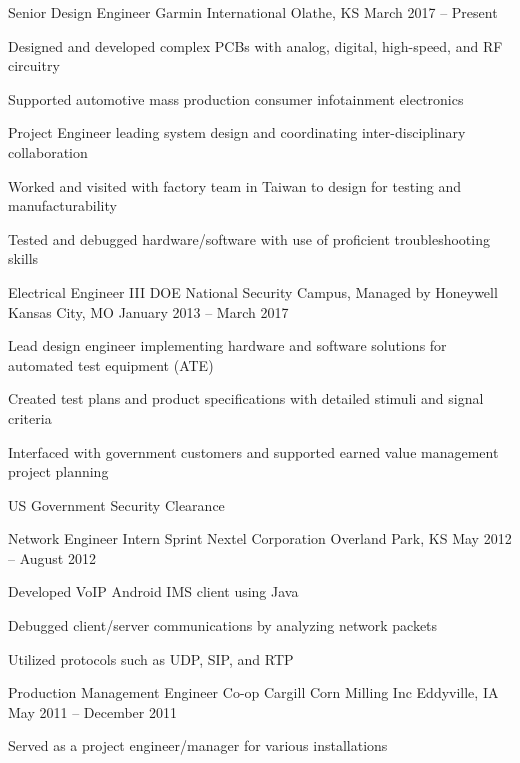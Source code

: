 \documentclass[]{awesome-cv}
\begin{document}
\vspace{-2mm}
\begin{cventries}
	\cventry
	{Senior Design Engineer}
	{Garmin International}
	{Olathe, KS}
	{March 2017 – Present}
	{\begin{cvitems}
		\item {Designed and developed complex PCBs with analog, digital, high-speed, and RF circuitry}
		\item {Supported automotive mass production consumer infotainment electronics}
		\item {Project Engineer leading system design and coordinating inter-disciplinary collaboration}
		\item {Worked and visited with factory team in Taiwan to design for testing and manufacturability}
		\item {Tested and debugged hardware/software with use of proficient troubleshooting skills}
		\end{cvitems}}
	\cventry
	{Electrical Engineer III}
	{DOE National Security Campus, Managed by Honeywell}
	{Kansas City, MO}
	{January 2013 – March 2017}
	{\begin{cvitems}
		\item {Lead design engineer implementing hardware and software solutions for automated test equipment (ATE)}
		\item {Created test plans and product specifications with detailed stimuli and signal criteria}
		\item {Interfaced with government customers and supported earned value management project planning}
		\item {US Government Security Clearance}
		\end{cvitems}}
	\cventry
	{Network Engineer Intern}
	{Sprint Nextel Corporation}
	{Overland Park, KS}
	{May 2012 – August 2012}
	{\begin{cvitems}
		\item {Developed VoIP Android IMS client using Java}
		\item {Debugged client/server communications by analyzing network packets}
		\item {Utilized protocols such as UDP, SIP, and RTP}
		\end{cvitems}}
	\cventry
	{Production Management Engineer Co-op}
	{Cargill Corn Milling Inc}
	{Eddyville, IA}
	{May 2011 – December 2011}
	{\begin{cvitems}
		\item {Served as a project engineer/manager for various installations}

\end{cvitems}}
\end{cventries}
\end{document}
